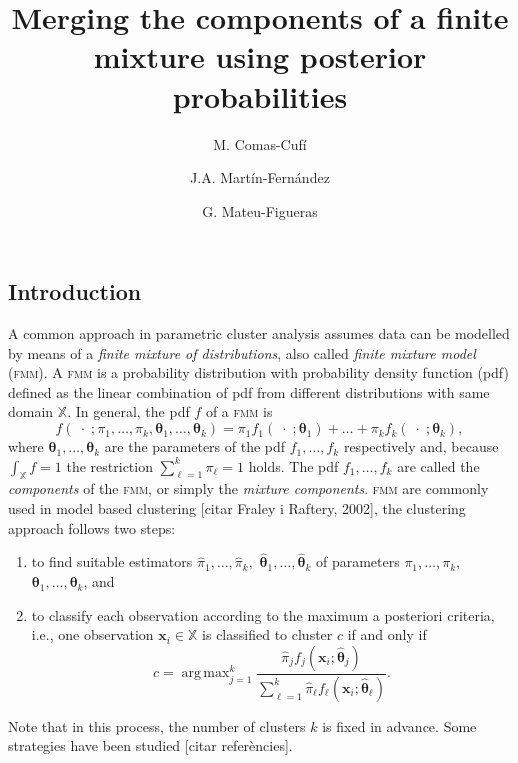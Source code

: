 \documentclass[10pt, a4paper]{article}
\title{Merging the components of a finite mixture using  posterior probabilities}
\author{M. Comas-Cufí \and J.A. Martín-Fernández \and G. Mateu-Figueras}
\DeclareMathOperator*{\argmax}{arg\,max}
\newcommand{\m}[1]{\boldsymbol{#1}}
\newcommand{\fmm}{\textsc{fmm}\xspace}
\begin{document}
\begin{spacing}{1.9}



\maketitle

\section{Introduction}


A common approach in parametric cluster analysis assumes data can be modelled by means of a \emph{finite mixture of distributions}, also called \emph{finite mixture model} (\fmm). A \fmm is a probability distribution with probability density function (pdf) defined as the linear combination of pdf from different distributions with same domain $\mathbb{X}$. In general, the pdf $f$ of a \fmm is
\begin{equation}\label{mixt}
f(\;\cdot\; ; \pi_1, \dots, \pi_k, \m\theta_1, \dots, \m\theta_k) = \pi_1 f_1(\;\cdot\; ; \m\theta_1) + \dots + \pi_k f_k(\;\cdot\; ; \m\theta_k),
\end{equation}
where $\m\theta_1, \dots,  \m\theta_k$ are the parameters of the pdf $f_1, \dots, f_k$ respectively and, because $\int_{\mathbb{X}}f = 1$ the restriction $\sum_{\ell = 1}^k \pi_\ell = 1$ holds. The pdf $f_1, \dots, f_k$ are called the \emph{components} of the \fmm, or simply the \emph{mixture components}. \fmm are commonly used in model based clustering [citar Fraley i Raftery, 2002], the clustering approach follows two steps:
\begin{enumerate}
\item to find suitable estimators $\hat{\pi}_1, \dots, \hat{\pi}_k,$ $\hat{\m\theta}_1, \dots, \hat{\m\theta}_k$ of parameters $\pi_1, \dots, \pi_k,$ $\m\theta_1, \dots, \m\theta_k$, and
\item to classify each observation according to the maximum a posteriori criteria, i.e., one observation $\m x_i \in \mathbb{X}$ is classified to cluster $c$ if and only if
\begin{equation}\label{map_criteria}
c=\argmax_{j=1}^k \frac{ \hat{\pi}_j f_j(\m x_i ; \hat{\m\theta}_j) }{\sum_{\ell=1}^k \hat{\pi}_\ell f_\ell(\m x_i ; \hat{\m\theta}_\ell) }.
\end{equation}
\end{enumerate}
Note that in this process, the number of clusters $k$ is fixed in advance. Some strategies have been studied [citar referències].


\end{spacing}
\end{document}
